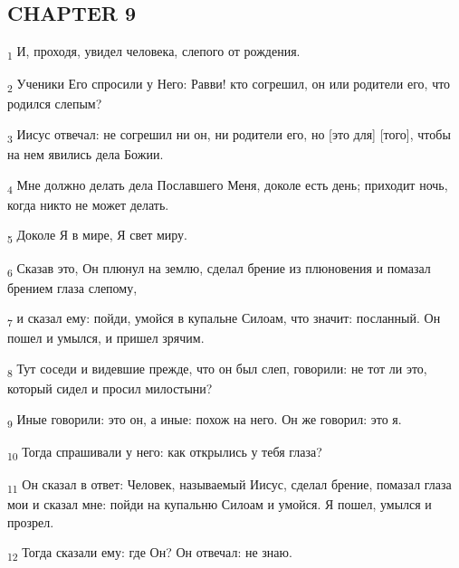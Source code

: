 \subsection{CHAPTER 9}
\begin{tcolorbox}
\textsubscript{1} И, проходя, увидел человека, слепого от рождения.
\end{tcolorbox}
\begin{tcolorbox}
\textsubscript{2} Ученики Его спросили у Него: Равви! кто согрешил, он или родители его, что родился слепым?
\end{tcolorbox}
\begin{tcolorbox}
\textsubscript{3} Иисус отвечал: не согрешил ни он, ни родители его, но [это для] [того], чтобы на нем явились дела Божии.
\end{tcolorbox}
\begin{tcolorbox}
\textsubscript{4} Мне должно делать дела Пославшего Меня, доколе есть день; приходит ночь, когда никто не может делать.
\end{tcolorbox}
\begin{tcolorbox}
\textsubscript{5} Доколе Я в мире, Я свет миру.
\end{tcolorbox}
\begin{tcolorbox}
\textsubscript{6} Сказав это, Он плюнул на землю, сделал брение из плюновения и помазал брением глаза слепому,
\end{tcolorbox}
\begin{tcolorbox}
\textsubscript{7} и сказал ему: пойди, умойся в купальне Силоам, что значит: посланный. Он пошел и умылся, и пришел зрячим.
\end{tcolorbox}
\begin{tcolorbox}
\textsubscript{8} Тут соседи и видевшие прежде, что он был слеп, говорили: не тот ли это, который сидел и просил милостыни?
\end{tcolorbox}
\begin{tcolorbox}
\textsubscript{9} Иные говорили: это он, а иные: похож на него. Он же говорил: это я.
\end{tcolorbox}
\begin{tcolorbox}
\textsubscript{10} Тогда спрашивали у него: как открылись у тебя глаза?
\end{tcolorbox}
\begin{tcolorbox}
\textsubscript{11} Он сказал в ответ: Человек, называемый Иисус, сделал брение, помазал глаза мои и сказал мне: пойди на купальню Силоам и умойся. Я пошел, умылся и прозрел.
\end{tcolorbox}
\begin{tcolorbox}
\textsubscript{12} Тогда сказали ему: где Он? Он отвечал: не знаю.
\end{tcolorbox}
